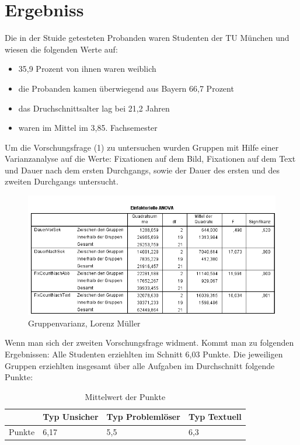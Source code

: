 \chapter{Ergebniss}

Die in der Stuide getesteten Probanden waren Studenten der TU München und wiesen die folgenden Werte auf:

    \begin{itemize}
        \item 35,9 Prozent von ihnen waren weiblich 
        \item die Probanden kamen überwiegend aus Bayern 66,7 Prozent
        \item das Druchschnittsalter lag bei 21,2 Jahren 
        \item waren im Mittel im 3,85. Fachsemester
    \end{itemize}

 Um die Vorschungsfrage (1) zu untersuchen wurden Gruppen mit Hilfe einer Varianzanalyse auf die Werte: Fixationen auf dem Bild, Fixationen auf dem Text und Dauer nach dem ersten Durchgangs, sowie der Dauer des ersten und des zweiten Durchgangs untersucht.


\begin{figure}[!ht]
\noindent\hspace{0.5mm}\includegraphics[width=15cm]{./Ressourcen/Gruppenunterscheidung.png}
\caption{Gruppenvarianz, Lorenz Müller}
\end{figure}

Wenn man sich der zweiten Vorschungsfrage widment. Kommt man zu folgenden Ergebnissen:
Alle Studenten erziehlten im Schnitt 6,03 Punkte. 
Die jeweiligen Gruppen erziehlten insgesamt über alle Aufgaben im Durchschnitt folgende Punkte:

\begin{table}[!h]
\hspace{-5pt}
\begin{tabularx}{\textwidth + 5pt}{| @{\hspace{3pt}} M || @{\hspace{3pt}} M  | @{\hspace{3pt}} M | @{\hspace{3pt}} M |}
\hline
\textbf{ } & \textbf{Typ Unsicher} & \textbf{Typ Problemlöser} & \textbf{Typ Textuell}\\
\hline
\hline
Punkte        & 6,17 & 5,5 & 6,3\\
\hline
\end{tabularx}
\caption{Mittelwert der Punkte}
\end{table}



